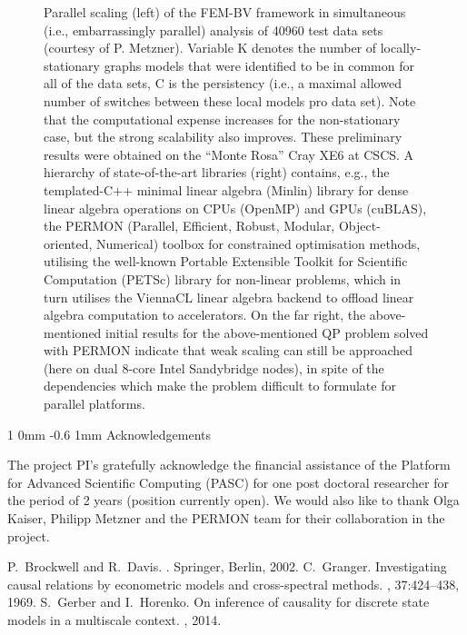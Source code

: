 \documentclass[a0,portrait]{a0poster}
\makeatletter
\renewcommand{\section}{\@startsection
        {section}%
        {1}%
        {0mm}%
        {-0.6\baselineskip}%
        {1mm}%
        {\Large\color{NTNUBlue}\bfseries}}%
\makeatother
\begin{document}
\begin{multicols}{2}
\begin{figure}[H]
\begin{center}
 \caption{Parallel scaling (left) of the FEM-BV framework in simultaneous (i.e., embarrassingly parallel) analysis of 40960 test data sets (courtesy of P. Metzner). Variable K denotes the number of locally-stationary graphs models that were identified to be in common for all of the data sets, C is the persistency (i.e., a maximal allowed number of switches between these local models pro data set). Note that the computational expense increases for the non-stationary case, but the strong scalability also improves. These preliminary results were obtained on the ``Monte Rosa'' Cray XE6 at CSCS.  A hierarchy of state-of-the-art libraries  (right) contains, e.g., the templated-C++ minimal linear algebra (Minlin) library for dense linear algebra operations on CPUs (OpenMP) and GPUs (cuBLAS), the PERMON (Parallel, Efficient, Robust, Modular, Object-oriented, Numerical) toolbox for constrained optimisation methods, utilising the well-known Portable Extensible Toolkit for Scientific Computation (PETSc) library  for non-linear problems, which in turn utilises the ViennaCL linear algebra backend  to offload linear algebra computation to accelerators. On the far right, the above-mentioned initial results for the above-mentioned QP problem solved with PERMON indicate that weak scaling can still be approached (here on dual 8-core Intel Sandybridge nodes), in spite of the dependencies which make the problem difficult to formulate for parallel platforms. }
 \end{center} \label{fig:Scaling}
\end{figure}

\vspace{-1.0cm}
%
\section{Acknowledgements}
\noindent
\par  The project PI's gratefully acknowledge the financial assistance of the Platform for Advanced Scientific Computing (PASC) for one post doctoral researcher for the period of 2 years {\color{NTNUBlue} (position currently open)}. We would also like to thank Olga Kaiser, Philipp Metzner and the PERMON team for their collaboration in the project.

\par


\begin{thebibliography}{10}
P.~Brockwell and R.~Davis.
.
\newblock Springer, Berlin, 2002.
C.~Granger.
\newblock Investigating causal relations by econometric models and
  cross-spectral methods.
, 37:424--438, 1969.
S.~Gerber and I.~Horenko.
\newblock On inference of causality for discrete state models in a multiscale
  context.
, 2014.

\end{thebibliography}

\end{multicols}
\end{document}
